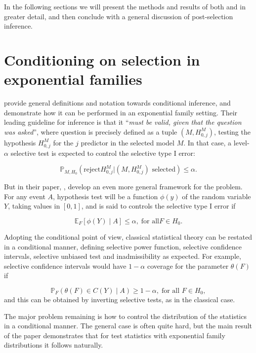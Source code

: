 \documentclass{article}
\begin{document}
In the following sections we will present the methods and results of both
\citet{fithian14optimal} and \citet{taylor14post} in greater detail, and then
conclude with a general discussion of post-selection inference.

\section{Conditioning on selection in exponential families}
\label{sec:fithian}

\citet{fithian14optimal} provide general definitions and notation towards
conditional inference, and demonstrate how it can be performed in an
exponential family setting. Their leading guideline for inference is that it
``\textit{must be valid, given that the question was asked}'', where question
is precisely defined as a tuple $\left(M,H_{0,j}^M \right)$, testing the
hypothesis $H_{0,j}^{M}$ for the $j$ predictor in the selected model $M$. In
that case, a level-$\alpha$ selective test is expected to control the selective
type I error:

\[\mathbb{P}_{M,H_0}\left(\text{reject}H_{0,j}^M
                | \left(M,H_{0,j}^M\right)\text{ selected}\right)
                                                                \leq \alpha.\]

But in their paper, \cite{fithian14optimal}, develop an even more general
framework for the problem. For any event $A$, hypothesis test will
be a function $\phi\left(y\right)$ of the random variable $Y$, taking
values in $\left[0,1\right]$, and is said to controls the selective
type I error if

\[
\mathbb{E}_{F}\left[\phi\left(Y\right)\mid A\right]\leq\alpha,\;\text{for all
}F\in H_{0}.
\]

Adopting the conditional point of view, classical statistical theory
can be restated in a conditional manner, defining selective power
function, selective confidence intervals, selective unbiased test and
inadmissibility as expected. For example, selective confidence intervals
would have $1-\alpha$ coverage for the parameter $\theta\left(F\right)$
if

\[
\mathbb{P}_{F}\left(\theta\left(F\right)\in C\left(Y\right)\mid
A\right)\geq1-\alpha,\;\text{for all }F\in H_{0},
\]
and this can be obtained by inverting selective tests, as in the classical
case. 

The major problem remaining is how to control the distribution of
the statistics in a conditional manner. The general case is often
quite hard, but the main result of the paper demonstrates that for
test statistics with exponential family distributions it follows naturally. 
\end{document}
